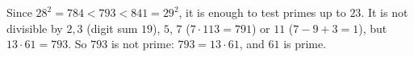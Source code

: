 Since $28^2=784<793<841=29^2$, it is enough to test primes up to $23$. It is not divisible by $2,3$ (digit sum $19$), $5$, $7$ ($7\cdot113=791$) or $11$ ($7-9+3=1$), but $13\cdot61=793$. So $793$ is not prime: $\boxed{793=13\cdot61}$, and $61$ is prime.
